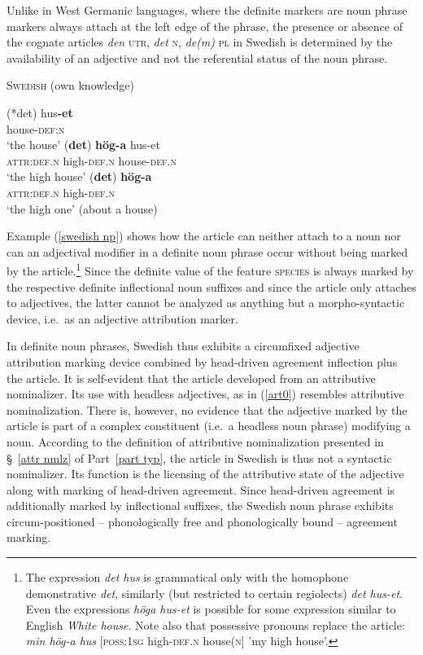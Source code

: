 Unlike in West Germanic languages, where the definite markers are noun phrase markers always attach at the left edge of the phrase, the presence or absence of the cognate articles \textit{den} \textsc{utr}, \textit{det} \textsc{n}, \textit{de(m)} \textsc{pl} in Swedish is determined by the availability of an adjective and not the referential status of the noun phrase. 
\begin{exe}
\ex \textsc{Swedish} (own knowledge) \label{swedish np}
\begin{xlist}
\ex
\gll	(*det) hus\textbf{-et}\\
	{} house-\textsc{def:n}\\
\glt	‘the house’
\ex	
\gll	*(\textbf{det}) \textbf{hög-a} hus-et\\
	\textsc{attr:def.n} high-\textsc{def.n} house-\textsc{def.n}\\
\glt	‘the high house’
\ex	\label{art0}
\gll	*(\textbf{det}) \textbf{hög-a}\\
	\textsc{attr:def.n} high-\textsc{def.n}\\
\glt	‘the high one’ (about a house)
\end{xlist}
\end{exe}
Example (\ref{swedish np}) shows how the article can neither attach to a noun nor can an adjectival modifier in a definite noun phrase occur without being marked by the article.\footnote{The expression \textit{det hus} is grammatical only with the homophone demonstrative \textit{det}, similarly (but restricted to certain regiolects) \textit{det hus-et}. Even the expressions \textit{höga hus-et} is possible for some expression similar to English \textit{White house}. Note also that possessive pronouns replace the article: \textit{min hög-a hus} [\textsc{poss:1sg} high-\textsc{def.n} house(\textsc{n}] 'my high house’.} Since the definite value of the feature \textsc{species} is always marked by the respective definite inflectional noun suffixes %
 and since the article only attaches to adjectives, the latter cannot be analyzed as anything but a morpho-syntactic device, i.e.~as an adjective attribution marker.

In definite noun phrases, Swedish thus exhibits a circumfixed adjective attribution marking device combined by head-driven agreement inflection plus the article. It is self-evident that the article developed from an attributive nominalizer. Its use with headless adjectives, as in (\ref{art0}) resembles attributive nominalization. There is, however, no evidence that the adjective marked by the article is part of a complex constituent (i.e.~a headless noun phrase) modifying a noun. According to the definition of attributive nominalization presented in \S~\ref{attr nmlz} of Part~\ref{part typ}, the article in Swedish is thus not a syntactic nominalizer. Its function is the licensing of the attributive state of the adjective along with marking of head-driven agreement. Since head-driven agreement is additionally marked by inflectional suffixes, the Swedish noun phrase exhibits circum-positioned – phonologically free and phonologically bound – agreement marking.

